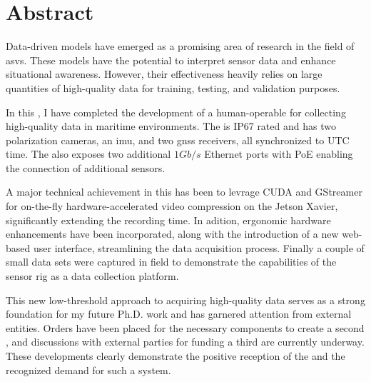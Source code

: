 \chapter*{Abstract}

Data-driven models have emerged as a promising area of research in the field of \glspl{asv}.
These models have the potential to interpret sensor data and enhance situational awareness.
However, their effectiveness heavily relies on large quantities of high-quality data for training, testing, and validation purposes.

In this \master, I have completed the development of a human-operable \sr for collecting high-quality data in maritime environments.
The \sr is IP67 rated and has two polarization cameras, an \gls{imu}, and two \gls{gnss} receivers, all synchronized to UTC time.
The \sr also exposes two additional $1Gb/s$ Ethernet ports with PoE  enabling the connection of additional sensors.

A major technical achievement in this \master has been to levrage CUDA and GStreamer for on-the-fly hardware-accelerated video compression on the Jetson Xavier, significantly extending the recording time.
In adition, ergonomic hardware enhancements have been incorporated, along with the introduction of a new web-based user interface, streamlining the data acquisition process.
Finally a couple of small data sets were captured in field to demonstrate the capabilities of the sensor rig as a data collection platform.

This new low-threshold approach to acquiring high-quality data serves as a strong foundation for my future Ph.D. work and has garnered attention from external entities. Orders have been placed for the necessary components to create a second \sr, and discussions with external parties for funding a third \sr are currently underway. These developments clearly demonstrate the positive reception of the \sr and the recognized demand for such a system.

